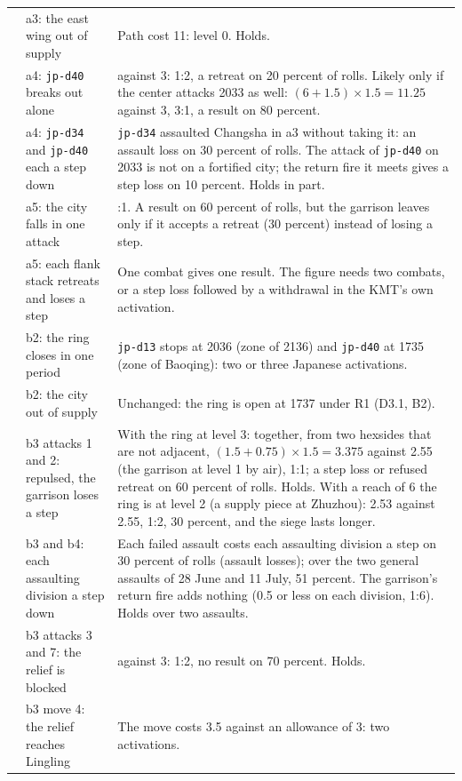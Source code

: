 \documentclass[11pt]{article}
\begin{document}
{\begin{longtable}{@{}>{\raggedright\arraybackslash}p{}>{\raggedright\arraybackslash}p{}>{\raggedright\arraybackslash}p{}@{}}
2 & a3: the east wing out of supply & Path cost 11: level 0. Holds. \\
2 & a4: \texttt{jp-d40} breaks out alone & 1.5 against 3: 1:2, a retreat on 20 percent of rolls. Likely only if the center attacks 2033 as well: $(6+1.5)\times 1.5=11.25$ against 3, 3:1, a result on 80 percent. \\
2 & a4: \texttt{jp-d34} and \texttt{jp-d40} each a step down & \texttt{jp-d34} assaulted Changsha in a3 without taking it: an assault loss on 30 percent of rolls. The attack of \texttt{jp-d40} on 2033 is not on a fortified city; the return fire it meets gives a step loss on 10 percent. Holds in part. \\
2 & a5: the city falls in one attack & 1:1. A result on 60 percent of rolls, but the garrison leaves only if it accepts a retreat (30 percent) instead of losing a step. \\
2 & a5: each flank stack retreats and loses a step & One combat gives one result. The figure needs two combats, or a step loss followed by a withdrawal in the KMT's own activation. \\
3 & b2: the ring closes in one period & \texttt{jp-d13} stops at 2036 (zone of 2136) and \texttt{jp-d40} at 1735 (zone of Baoqing): two or three Japanese activations. \\
3 & b2: the city out of supply & Unchanged: the ring is open at 1737 under R1 (D3.1, B2). \\
3 & b3 attacks 1 and 2: repulsed, the garrison loses a step & With the ring at level 3: together, from two hexsides that are not adjacent, $(1.5+0.75)\times 1.5=3.375$ against 2.55 (the garrison at level 1 by air), 1:1; a step loss or refused retreat on 60 percent of rolls. Holds. With a reach of 6 the ring is at level 2 (a supply piece at Zhuzhou): 2.53 against 2.55, 1:2, 30 percent, and the siege lasts longer. \\
3 & b3 and b4: each assaulting division a step down & Each failed assault costs each assaulting division a step on 30 percent of rolls (assault losses); over the two general assaults of 28 June and 11 July, 51 percent. The garrison's return fire adds nothing (0.5 or less on each division, 1:6). Holds over two assaults. \\
3 & b3 attacks 3 and 7: the relief is blocked & 2 against 3: 1:2, no result on 70 percent. Holds. \\
3 & b3 move 4: the relief reaches Lingling & The move costs 3.5 against an allowance of 3: two activations. \\

\end{longtable}}
\end{document}
